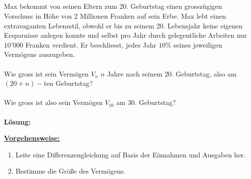 \newpage
\subsection*{}
Max bekommt von seinen Eltern zum 20. Geburtstag einen grosszügigen Vorschuss in Höhe von 2 Millionen Franken auf sein Erbe. Max lebt einen extravaganten Lebensstil, obwohl er bis zu seinem 20. Lebensjahr keine eigenen Ersparnisse anlegen konnte und selbst pro Jahr durch gelegentliche Arbeiten nur $ 10'000 $ Franken verdient. Er beschliesst, jedes Jahr $ 10 \% $ seines jeweiligen Vermögens auszugeben.\\
\\
Wie gross ist sein Vermögen $ V_n $ $ n $ Jahre nach seinem 20. Geburtstag, also am $ (20+ n)- $ten Geburtstag?\\
\\
Wie gross ist also sein Vermögen $ V_{10} $ am $ 30. $ Geburtstag?
\\ \\
\textbf{Lösung:}
\begin{mdframed}
\underline{\textbf{Vorgehensweise:}}
\begin{enumerate}
\item Leite eine Differenzengleichung auf Basis der Einnahmen und Ausgaben her.
\item Bestimme die Größe des Vermögens.
\end{enumerate}
\end{mdframed}

